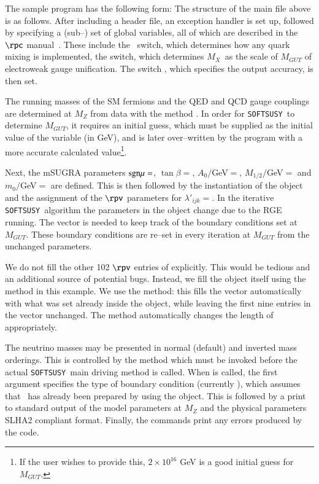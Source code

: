 \documentclass[pdflatex,final,3p,times]{elsarticle}
\def\SOFTSUSY{{\tt SOFTSUSY}}
\begin{document}
The sample program has the following form: 
\small\normalsize 
The structure of the main file above is as follows.  After
including a header file, an exception handler is set up, followed by
specifying a (sub--) set of global variables, all of which are
described in the $\rpc$ manual~\cite{Allanach:2001kg}.  These include
the ~switch, which determines how any quark mixing is
implemented, the
 switch, which determines $M_X$~as
the scale of $M_{GUT}$ of electroweak gauge unification. The
switch 
 , which specifies the output
accuracy, is then set.

The running masses of the SM fermions and the QED and QCD gauge
couplings are determined at $M_Z$ from data with the method
.  In order for \SOFTSUSY~to determine $M_{GUT}$, it
requires an initial guess, which must be supplied as the initial value
of the variable  (in GeV), and is later over--written by
the program with a more accurate calculated value\footnote{If the user wishes
  to provide this, $2 \times 
  10^{16}$ GeV is a good initial guess for $M_{GUT}$.}.

Next, the mSUGRA parameters ${\rm
  sgn}\mu=$, $\tan \beta=$,
$A_0/$GeV$=$, $M_{1/2}/$GeV$=$  and
$m_0/$GeV$=$ are defined.  This is then followed by the instantiation
of the  object  and the assignment of the
$\rpv$ parameters  for
$\lambda'_{ijk}=$.  In the iterative \SOFTSUSY~algorithm the
parameters in the  object change due to the RGE
running.  The  vector is needed to keep track of the
boundary conditions set at $M_{GUT}$.  These boundary conditions are
re--set in every iteration at $M_{GUT}$ from the unchanged
 parameters.

We do not fill the other 102 $\rpv$ entries of 
explicitly. This would be tedious and an additional source of
potential bugs. Instead, we fill the  object itself
using the  method in this example.  We use the
 method: this fills the  vector
automatically with what was set already inside the 
object, while leaving the first nine entries in the vector unchanged.
The  method automatically changes the length of
 appropriately.  

The neutrino masses may be presented in normal (default) and inverted
mass orderings.  This is controlled by the method
 which must be invoked before the actual
\SOFTSUSY~main driving method  is called.  When
 is called, the first argument specifies the type of
boundary condition (currently ), which assumes that
~has already been prepared by using the 
object.  This is followed by a print to standard output of the model
parameters at $M_Z$ and the physical parameters SLHA2 compliant format.
Finally, the 
 commands print any errors produced by the code.
\end{document}
